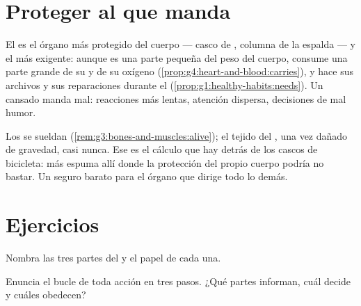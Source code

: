 \section{Proteger al que manda}

\begin{proposition}\label{prop:g5:brain-in-command:protect}
El  es el órgano más protegido del cuerpo --- casco de ,
columna de la espalda --- y el más exigente: aunque es una parte
pequeña del peso del cuerpo, consume una parte grande de su  y
de su oxígeno (\cref{prop:g4:heart-and-blood:carries}), y hace sus
archivos y sus reparaciones durante el \emph{}
(\cref{prop:g1:healthy-habits:needs}). Un  cansado manda mal:
reacciones más lentas, atención dispersa, decisiones de mal humor.
\end{proposition}
\admitted

\begin{example}\label{ex:g5:brain-in-command:helmet}
Los  se sueldan (\cref{rem:g3:bones-and-muscles:alive}); el
tejido del , una vez dañado de gravedad, casi nunca. Ese es el
cálculo que hay detrás de los cascos de bicicleta:  más espuma
allí donde la protección del propio cuerpo podría no bastar. Un seguro
barato para el órgano que dirige todo lo demás.
\end{example}

\section{Ejercicios}

\begin{exercise}[$\star$]\label{exo:g5:brain-in-command:1}
Nombra las tres partes del  y el papel de cada una.
\end{exercise}

\begin{exercise}[$\star$]\label{exo:g5:brain-in-command:2}
Enuncia el bucle de toda acción en tres pasos. ¿Qué partes informan,
cuál decide y cuáles obedecen?
\end{exercise}

